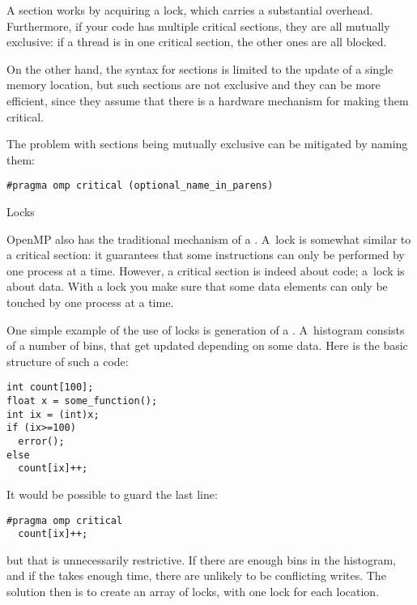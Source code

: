 A  section works by acquiring a lock, which carries a substantial overhead.
Furthermore, if your code has multiple critical sections, they are all mutually exclusive:
if a thread is in one critical section, the other ones are all blocked.

On the other hand, the syntax for  sections is limited to the update
of a single memory location, but such sections
are not exclusive and they can be more efficient, since they assume that there is a hardware
mechanism for making them critical.

The problem with  sections being mutually exclusive can be mitigated by naming them:
\begin{verbatim}
#pragma omp critical (optional_name_in_parens)
\end{verbatim}

 {Locks}

OpenMP also has the traditional mechanism of a . A~lock is somewhat similar to 
a critical section: it guarantees that some instructions can only be performed by one
process at a time. However, a critical section is indeed about code; a~lock is about data.
With a lock you make sure that some data elements can only be touched by one process at a time.

One simple example of the use of locks is generation of a .
A~histogram consists of a number of bins, that get updated depending on some data.
Here is the basic structure of such a code:
\begin{verbatim}
int count[100];
float x = some_function();
int ix = (int)x;
if (ix>=100)
  error();
else
  count[ix]++;
\end{verbatim}
It would be possible to guard the last line:
\begin{verbatim}
#pragma omp critical
  count[ix]++;
\end{verbatim}
but that is unnecessarily restrictive. If there are enough bins in the
histogram, and if the  takes enough time, there are unlikely to be
conflicting writes. The solution then is to create an array of locks, with
one lock for each  location.

